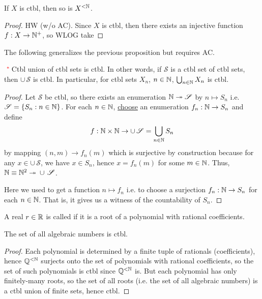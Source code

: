 \documentclass[14pt,oneside]{extarticle}
\begin{document}
\begin{proposition*}
  If $X$ is ctbl, then so is $X^{< \mathbb{N}}$.  
\end{proposition*}

\begin{proof}
    HW (w/o AC). Since $X$ is ctbl, then there exists an injective function $f: X \to \mathbb{N}^+$, so WLOG take 
\end{proof}

The following generalizes the previous proposition but requires AC.

\begin{proposition*}$\text{ }\textcolor{red}{^*} \! \! \! \! \,\,\,$ Ctbl union of ctbl sets is ctbl. In other words, if $\mathscr{S}$ is a ctbl set of ctbl sets, then $\cup \, \mathscr{S}$ is ctbl. In particular, for ctbl sets $X_n$, $n \in \mathbb{N}$, $\bigcup_{n \in \mathbb{N}} X_n$ is ctbl.
\end{proposition*}
\begin{proof}
Let $\mathscr{S}$ be ctbl, so there exists an enumeration $\mathbb{N} \twoheadrightarrow{} \mathscr{S}$ by $n \mapsto S_n$ i.e. $\mathscr{S} = \{S_n: n \in \mathbb{N}\}$. For each $n \in \mathbb{N}$, \underline{choose} an enumeration $f_n: \mathbb{N} \to S_n$ and define \[f: \mathbb{N} \times \mathbb{N} \to \cup \, \mathscr{S} = \bigcup_{n \in \mathbb{N}} S_n\]
by mapping $(n,m) \to f_n(m)$ which is surjective by construction because for any $x \in \cup \, \mathscr{S}$, we have $x \in S_n$, hence $x = f_n(m)$ for some $m \in \mathbb{N}$. Thus, $\mathbb{N} \equiv \mathbb{N}^2 \twoheadrightarrow{} \cup \, \mathscr{S}$.

\pic

Here we used \AC{} to get a function $n \mapsto f_n$ i.e. to choose a surjection $f_n: \mathbb{N} \to S_n$ for each $n \in \mathbb{N}$. That is, it gives us a witness of the countability of $S_n$.
\end{proof}

\begin{definition*}
  A real $r \in \mathbb{R}$ is called  if it is a root of a polynomial with rational coefficients.
\end{definition*}

\begin{corollary*}
  The set of all algebraic numbers is ctbl.
\end{corollary*}
\begin{proof}
  Each polynomial is determined by a finite tuple of rationals (coefficients), hence $\mathbb{Q}^{<\mathbb{N}}$ surjects onto the set of polynomials with rational coefficients, so the set of such polynomials is ctbl since $\mathbb{Q}^{<\mathbb{N}}$ is. But each polynomial has only finitely-many roots, so the set of all roots (i.e. the set of all algebraic numbers) is a ctbl union of finite sets, hence ctbl.
\end{proof}
\end{document}
